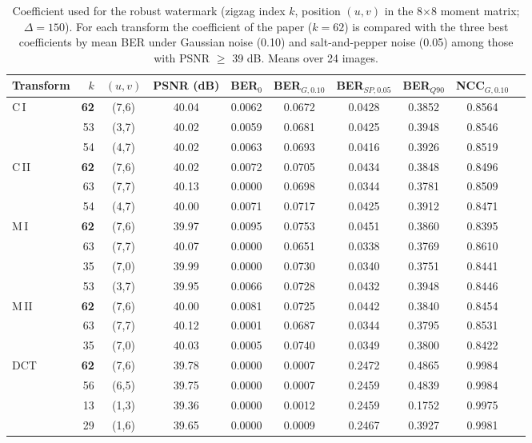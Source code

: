 \begin{table}[t]
\centering
\caption{Coefficient used for the robust watermark (zigzag index $k$, position $(u,v)$ in the 8$\times$8 moment matrix; $\Delta=150$). For each transform the coefficient of the paper ($k=62$) is compared with the three best coefficients by mean BER under Gaussian noise (0.10) and salt-and-pepper noise (0.05) among those with PSNR $\geq$ 39 dB. Means over 24 images.}
\label{tab:coefficient_sensitivity}
\setlength{\tabcolsep}{3pt}
\small
\begin{tabular}{lrcccccccc}
\toprule
Transform & $k$ & $(u,v)$ & PSNR (dB) & BER$_0$ & BER$_{G,0.10}$ & BER$_{SP,0.05}$ & BER$_{Q90}$ & NCC$_{G,0.10}$ \\
\midrule
C\,I & \textbf{62} & (7,6) & 40.04 & 0.0062 & 0.0672 & 0.0428 & 0.3852 & 0.8564 \\
 & 53 & (3,7) & 40.02 & 0.0059 & 0.0681 & 0.0425 & 0.3948 & 0.8546 \\
 & 54 & (4,7) & 40.02 & 0.0063 & 0.0693 & 0.0416 & 0.3926 & 0.8519 \\
\midrule
C\,II & \textbf{62} & (7,6) & 40.02 & 0.0072 & 0.0705 & 0.0434 & 0.3848 & 0.8496 \\
 & 63 & (7,7) & 40.13 & 0.0000 & 0.0698 & 0.0344 & 0.3781 & 0.8509 \\
 & 54 & (4,7) & 40.00 & 0.0071 & 0.0717 & 0.0425 & 0.3912 & 0.8471 \\
\midrule
M\,I & \textbf{62} & (7,6) & 39.97 & 0.0095 & 0.0753 & 0.0451 & 0.3860 & 0.8395 \\
 & 63 & (7,7) & 40.07 & 0.0000 & 0.0651 & 0.0338 & 0.3769 & 0.8610 \\
 & 35 & (7,0) & 39.99 & 0.0000 & 0.0730 & 0.0340 & 0.3751 & 0.8441 \\
 & 53 & (3,7) & 39.95 & 0.0066 & 0.0728 & 0.0432 & 0.3948 & 0.8446 \\
\midrule
M\,II & \textbf{62} & (7,6) & 40.00 & 0.0081 & 0.0725 & 0.0442 & 0.3840 & 0.8454 \\
 & 63 & (7,7) & 40.12 & 0.0001 & 0.0687 & 0.0344 & 0.3795 & 0.8531 \\
 & 35 & (7,0) & 40.03 & 0.0005 & 0.0740 & 0.0349 & 0.3800 & 0.8422 \\
\midrule
DCT & \textbf{62} & (7,6) & 39.78 & 0.0000 & 0.0007 & 0.2472 & 0.4865 & 0.9984 \\
 & 56 & (6,5) & 39.75 & 0.0000 & 0.0007 & 0.2459 & 0.4839 & 0.9984 \\
 & 13 & (1,3) & 39.36 & 0.0000 & 0.0012 & 0.2459 & 0.1752 & 0.9975 \\
 & 29 & (1,6) & 39.65 & 0.0000 & 0.0009 & 0.2467 & 0.3927 & 0.9981 \\
\bottomrule
\end{tabular}
\end{table}
